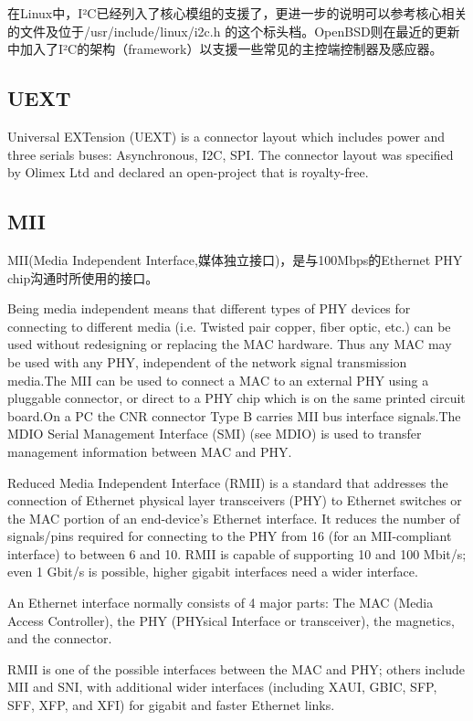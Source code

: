 在Linux中，I²C已经列入了核心模组的支援了，更进一步的说明可以参考核心相关的文件及位于/usr/include/linux/i2c.h 的这个标头档。OpenBSD则在最近的更新中加入了I²C的架构（framework）以支援一些常见的主控端控制器及感应器。

\subsection{UEXT}
Universal EXTension (UEXT) is a connector layout which includes power and three serials buses: Asynchronous, I2C, SPI. The connector layout was specified by Olimex Ltd and declared an open-project that is royalty-free.

\subsection{MII}
MII(Media Independent Interface,媒体独立接口)，是与100Mbps的Ethernet PHY chip沟通时所使用的接口。

Being media independent means that different types of PHY devices for connecting to different media (i.e. Twisted pair copper, fiber optic, etc.) can be used without redesigning or replacing the MAC hardware. Thus any MAC may be used with any PHY, independent of the network signal transmission media.The MII can be used to connect a MAC to an external PHY using a pluggable connector, or direct to a PHY chip which is on the same printed circuit board.On a PC the CNR connector Type B carries MII bus interface signals.The MDIO Serial Management Interface (SMI) (see MDIO) is used to transfer management information between MAC and PHY.

Reduced Media Independent Interface (RMII) is a standard that addresses the connection of Ethernet physical layer transceivers (PHY) to Ethernet switches or the MAC portion of an end-device's Ethernet interface. It reduces the number of signals/pins required for connecting to the PHY from 16 (for an MII-compliant interface) to between 6 and 10. RMII is capable of supporting 10 and 100 Mbit/s; even 1 Gbit/s is possible, higher gigabit interfaces need a wider interface.

An Ethernet interface normally consists of 4 major parts: The MAC (Media Access Controller), the PHY (PHYsical Interface or transceiver), the magnetics, and the connector.

RMII is one of the possible interfaces between the MAC and PHY; others include MII and SNI, with additional wider interfaces (including XAUI, GBIC, SFP, SFF, XFP, and XFI) for gigabit and faster Ethernet links.


